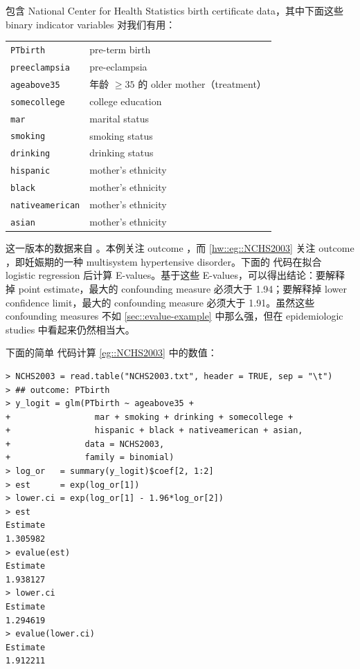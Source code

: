 \begin{example}
\label{eg::NCHS2003}
 包含 National Center for Health Statistics birth certificate data，其中下面这些 binary indicator variables 对我们有用：


 

\begin{tabular}{ll}
\hline 
\texttt{PTbirth} &
 pre-term birth \\
\texttt{preeclampsia} &
 pre-eclampsia \\
\texttt{ageabove35}& 
 年龄 $\geq 35$ 的 older mother（treatment）\\
\texttt{somecollege}&
 college education \\
\texttt{mar}& 
 marital status \\
\texttt{smoking}& 
 smoking status \\
\texttt{drinking}& 
 drinking status \\
\texttt{hispanic}& 
 mother's ethnicity  \\
\texttt{black}& 
 mother's ethnicity  \\
\texttt{nativeamerican}& 
 mother's ethnicity \\
\texttt{asian}& 
 mother's ethnicity\\
 \hline 
\end{tabular} 



这一版本的数据来自 \citet{valeri2014estimation}。本例关注 outcome ，而 \cref{hw::eg::NCHS2003} 关注 outcome ，即妊娠期的一种 multisystem hypertensive disorder。下面的  代码在拟合 logistic regression 后计算 E-values。基于这些 E-values，可以得出结论：要解释掉 point estimate，最大的 confounding measure 必须大于 1.94；要解释掉 lower confidence limit，最大的 confounding measure 必须大于 1.91。虽然这些 confounding measures 不如 \cref{sec::evalue-example} 中那么强，但在 epidemiologic studies 中看起来仍然相当大。
\end{example}


下面的简单  代码计算 \cref{eg::NCHS2003} 中的数值：
 \begin{lstlisting}
> NCHS2003 = read.table("NCHS2003.txt", header = TRUE, sep = "\t")
> ## outcome: PTbirth
> y_logit = glm(PTbirth ~ ageabove35 + 
+                 mar + smoking + drinking + somecollege + 
+                 hispanic + black + nativeamerican + asian,
+               data = NCHS2003, 
+               family = binomial)
> log_or   = summary(y_logit)$coef[2, 1:2]
> est      = exp(log_or[1])
> lower.ci = exp(log_or[1] - 1.96*log_or[2])
> est
Estimate 
1.305982 
> evalue(est)
Estimate 
1.938127 
> lower.ci
Estimate 
1.294619 
> evalue(lower.ci)
Estimate 
1.912211 
\end{lstlisting}


